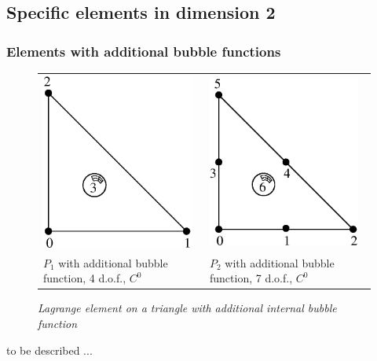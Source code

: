 \documentclass[11pt,a4paper]{article}
\begin{document}
\subsection{Specific elements in dimension 2}
\subsubsection{Elements with additional bubble functions}

\begin{figure}[H]
  \begin{center}
    \begin{tabular}{m{7cm}m{7cm}}
      \includegraphics[width=5cm,angle=0]{getfemlist_triangle_P1_bubble.eps} & \includegraphics[width=5cm,angle=0]{getfemlist_triangle_P2_bubble.eps}  \\
      $P_1$ with additional bubble function, 4 d.o.f., $C^0$ & $P_2$ with additional bubble function, 7 d.o.f., $C^0$
    \end{tabular}
  \end{center}
  \caption{ \it Lagrange element on a triangle with additional internal bubble function} 
  \label{fig:triangle_p1_bubble}
\end{figure}

to be described ...
\end{document}
